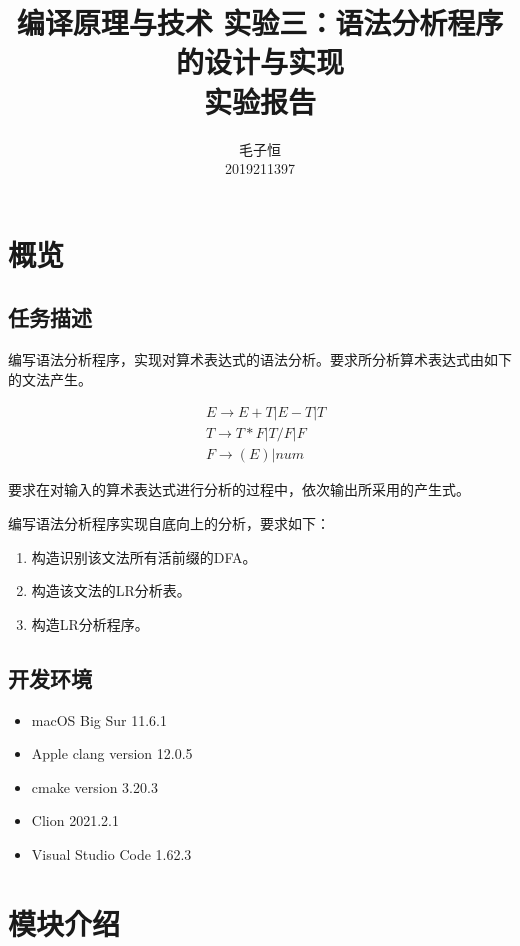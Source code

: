 \documentclass[lang=cn,11pt,a4paper,cite=authornum]{paper}
\title{编译原理与技术 实验三：语法分析程序的设计与实现 \\ 实验报告}
\author{毛子恒 \\ 2019211397}
\institute{北京邮电大学\ 计算机学院}
\date{\zhtoday}
\begin{document}
\maketitle

\section{概览}

\subsection{任务描述}

编写语法分析程序，实现对算术表达式的语法分析。要求所分析算术表达式由如下的文法产生。

\label{grammar}
$$
    \begin{aligned}
         & E\rightarrow E+T | E-T | T \\
         & T\rightarrow T*F | T/F | F \\
         & F\rightarrow (E) | num
    \end{aligned}
$$

要求在对输入的算术表达式进行分析的过程中，依次输出所采用的产生式。

编写语法分析程序实现自底向上的分析，要求如下：

\begin{enumerate}
    \item 构造识别该文法所有活前缀的DFA。
    \item 构造该文法的LR分析表。
    \item 构造LR分析程序。
\end{enumerate}

\subsection{开发环境}

\begin{itemize}
    \item macOS Big Sur 11.6.1
    \item Apple clang version 12.0.5
    \item cmake version 3.20.3
    \item Clion 2021.2.1
    \item Visual Studio Code 1.62.3
\end{itemize}

\section{模块介绍}
\end{document}
